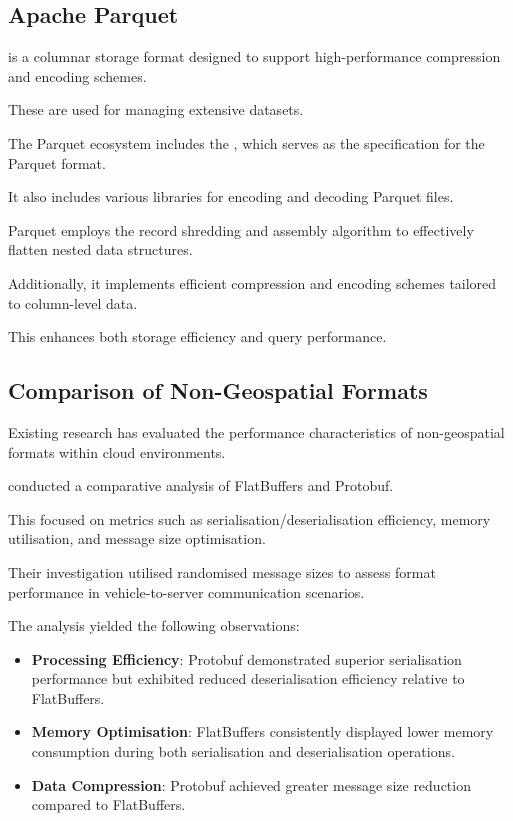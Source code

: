 \subsection{Apache Parquet}
\label{rw:non_geospatial_formats:parquet}

\citet{parquet} is a columnar storage format designed to support high-performance compression and encoding schemes.

These are used for managing extensive datasets.

The Parquet ecosystem includes the \citet{parquet-format}, which serves as the specification for the Parquet format.

It also includes various libraries for encoding and decoding Parquet files.

Parquet employs the record shredding and assembly algorithm \citep{dremel_2010} to effectively flatten nested data structures.

Additionally, it implements efficient compression and encoding schemes tailored to column-level data.

This enhances both storage efficiency and query performance.

\subsection{Comparison of Non-Geospatial Formats}
\label{rw:non_geospatial_formats:comparison}

Existing research has evaluated the performance characteristics of non-geospatial formats within cloud environments.

\citet{daniel_persson_2020} conducted a comparative analysis of FlatBuffers and Protobuf.

This focused on metrics such as serialisation/deserialisation efficiency, memory utilisation, and message size optimisation.

Their investigation utilised randomised message sizes to assess format performance in vehicle-to-server communication scenarios.

The analysis yielded the following observations:

\begin{itemize}
  \item \textbf{Processing Efficiency}: Protobuf demonstrated superior serialisation performance but exhibited reduced deserialisation efficiency relative to FlatBuffers.
  \item \textbf{Memory Optimisation}: FlatBuffers consistently displayed lower memory consumption during both serialisation and deserialisation operations.
  \item \textbf{Data Compression}: Protobuf achieved greater message size reduction compared to FlatBuffers.
\end{itemize}

